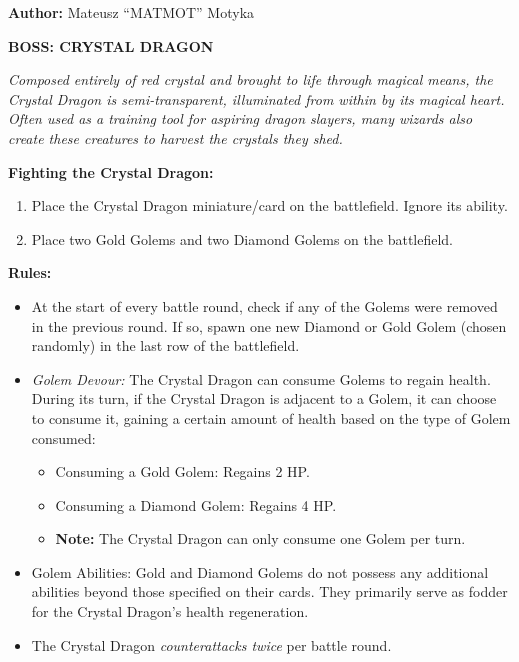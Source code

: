 

\textbf{Author:} Mateusz ``MATMOT'' Motyka

\pagebreak

\begin{minipage}{0.3\textwidth}
\end{minipage}
\begin{minipage}{0.7\textwidth}
  \textbf{\MakeUppercase{Boss: Crystal Dragon}}

  \textit{Composed entirely of red crystal and brought to life through magical means, the Crystal Dragon is semi-transparent, illuminated from within by its magical heart.
    Often used as a training tool for aspiring dragon slayers, many wizards also create these creatures to harvest the crystals they shed.
  }

  \textbf{Fighting the Crystal Dragon:}
  \begin{enumerate}
    \item Place the Crystal Dragon miniature/card on the battlefield. Ignore its ability.
    \item Place two Gold Golems and two Diamond Golems on the battlefield.
  \end{enumerate}

  \textbf{Rules:}
  \begin{itemize}
    \item At the start of every battle round, check if any of the Golems were removed in the previous round.
      If so, spawn one new Diamond or Gold Golem (chosen randomly) in the last row of the battlefield.
    \item \textit{Golem Devour:} The Crystal Dragon can consume Golems to regain health.
      During its turn, if the Crystal Dragon is adjacent to a Golem, it can choose to consume it, gaining a certain amount of health based on the type of Golem consumed:
      \begin{itemize}
        \item Consuming a Gold Golem: Regains 2 HP.
        \item Consuming a Diamond Golem: Regains 4 HP.
        \item[] \textbf{Note:} The Crystal Dragon can only consume one Golem per turn.
      \end{itemize}
    \item Golem Abilities: Gold and Diamond Golems do not possess any additional abilities beyond those specified on their cards.
      They primarily serve as fodder for the Crystal Dragon's health regeneration.
    \item The Crystal Dragon \textit{counterattacks twice} per battle round.
  \end{itemize}
\end{minipage}

